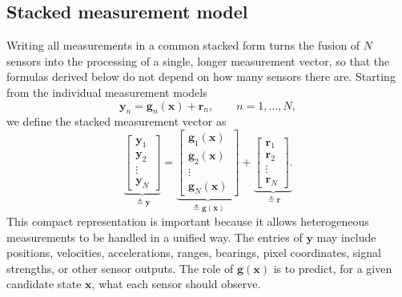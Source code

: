 \documentclass[graybox,envcountchap]{style/SNmono}
\begin{document}
\subsection{Stacked measurement model}

Writing all measurements in a common stacked form turns the fusion of $N$ sensors into the processing of a single, longer measurement vector, so that the formulas derived below do not depend on how many sensors there are. Starting from the individual measurement models
\begin{equation}
\mathbf{y}_n
=
\mathbf{g}_n(\mathbf{x})
+
\mathbf{r}_n,
\qquad n=1,\ldots,N,
\end{equation}
we define the stacked measurement vector as
\begin{equation}
\underbrace{\begin{bmatrix}
\mathbf{y}_1\\
\mathbf{y}_2\\
\vdots\\
\mathbf{y}_N
\end{bmatrix}}_{\triangleq \mathbf{y}} = 
\underbrace{\begin{bmatrix}
\mathbf{g}_1(\mathbf{x})\\
\mathbf{g}_2(\mathbf{x})\\
\vdots\\
\mathbf{g}_N(\mathbf{x})
\end{bmatrix}}_{\triangleq \mathbf{g}(\mathbf{x})} + 
\underbrace{\begin{bmatrix}
\mathbf{r}_1\\
\mathbf{r}_2\\
\vdots\\
\mathbf{r}_N
\end{bmatrix}.}_{\triangleq \mathbf{r}}
\end{equation}
This compact representation is important because it allows heterogeneous measurements to be handled in a unified way. The entries of $\mathbf{y}$ may include positions, velocities, accelerations, ranges, bearings, pixel coordinates, signal strengths, or other sensor outputs. The role of $\mathbf{g}(\mathbf{x})$ is to predict, for a given candidate state $\mathbf{x}$, what each sensor should observe.
\end{document}
